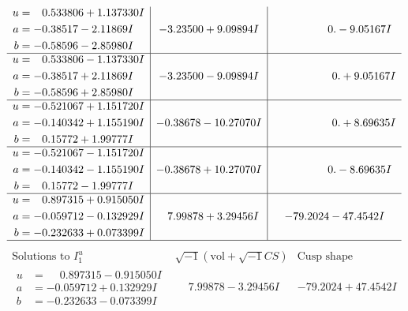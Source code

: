\documentclass[1p]{elsarticle_modified}
\theoremstyle{definition}
\newcommand{\I}{\sqrt{-1}}
\begin{document}
$$\begin{array}{c|c|c}
\begin{aligned}
u &= \phantom{-}0.533806 + 1.137330 I \\
a &= -0.38517 - 2.11869 I \\
b &= -0.58596 - 2.85980 I\end{aligned}
 & -3.23500 + 9.09894 I & \phantom{-0.000000 } 0. - 9.05167 I \\ \hline\begin{aligned}
u &= \phantom{-}0.533806 - 1.137330 I \\
a &= -0.38517 + 2.11869 I \\
b &= -0.58596 + 2.85980 I\end{aligned}
 & -3.23500 - 9.09894 I & \phantom{-0.000000 -}0. + 9.05167 I \\ \hline\begin{aligned}
u &= -0.521067 + 1.151720 I \\
a &= -0.140342 + 1.155190 I \\
b &= \phantom{-}0.15772 + 1.99777 I\end{aligned}
 & -0.38678 - 10.27070 I & \phantom{-0.000000 -}0. + 8.69635 I \\ \hline\begin{aligned}
u &= -0.521067 - 1.151720 I \\
a &= -0.140342 - 1.155190 I \\
b &= \phantom{-}0.15772 - 1.99777 I\end{aligned}
 & -0.38678 + 10.27070 I & \phantom{-0.000000 } 0. - 8.69635 I \\ \hline\begin{aligned}
u &= \phantom{-}0.897315 + 0.915050 I \\
a &= -0.059712 - 0.132929 I \\
b &= -0.232633 + 0.073399 I\end{aligned}
 & \phantom{-}7.99878 + 3.29456 I & -79.2024 - 47.4542 I\\
 \hline 
 \end{array}$$\newpage$$\begin{array}{c|c|c}  
\text{Solutions to }I^u_{1}& \I (\text{vol} + \sqrt{-1}CS) & \text{Cusp shape}\\
 \hline 
\begin{aligned}
u &= \phantom{-}0.897315 - 0.915050 I \\
a &= -0.059712 + 0.132929 I \\
b &= -0.232633 - 0.073399 I\end{aligned}
 & \phantom{-}7.99878 - 3.29456 I & -79.2024 + 47.4542 I \\ \hline\begin{aligned}

\end{aligned}
\end{array}$$
\end{document}
